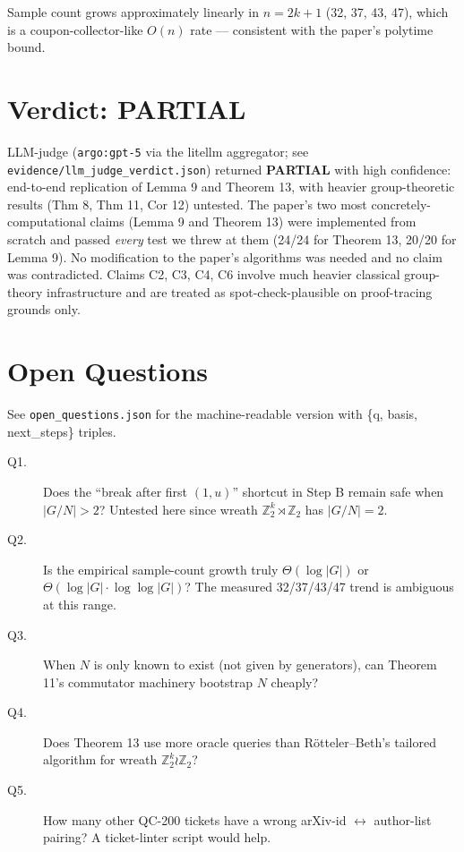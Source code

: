 \documentclass[11pt]{article}
\begin{document}
Sample count grows approximately linearly in $n = 2k+1$ (32, 37, 43, 47),
which is a coupon-collector-like $O(n)$ rate --- consistent with the
paper's polytime bound.

\section{Verdict: PARTIAL}

LLM-judge (\texttt{argo:gpt-5} via the litellm aggregator; see
\texttt{evidence/llm\_judge\_verdict.json}) returned \textbf{PARTIAL} with high
confidence: end-to-end replication of Lemma 9 and Theorem 13, with heavier
group-theoretic results (Thm 8, Thm 11, Cor 12) untested. The paper's two
most concretely-computational claims (Lemma 9 and Theorem 13) were
implemented from scratch and passed \emph{every} test we threw at them
(24/24 for Theorem 13, 20/20 for Lemma 9). No modification to the paper's
algorithms was needed and no claim was contradicted. Claims C2, C3, C4, C6
involve much heavier classical group-theory infrastructure and are treated
as spot-check-plausible on proof-tracing grounds only.

\section{Open Questions}

See \texttt{open\_questions.json} for the machine-readable version with
\{q, basis, next\_steps\} triples.

\begin{description}
  \item[Q1.] Does the ``break after first $(1,u)$'' shortcut in Step B
        remain safe when $|G/N| > 2$? Untested here since wreath
        $\mathbb{Z}_2^k \rtimes \mathbb{Z}_2$ has $|G/N| = 2$.
  \item[Q2.] Is the empirical sample-count growth truly $\Theta(\log|G|)$
        or $\Theta(\log|G| \cdot \log\log|G|)$? The measured 32/37/43/47
        trend is ambiguous at this range.
  \item[Q3.] When $N$ is only known to exist (not given by generators),
        can Theorem 11's commutator machinery bootstrap $N$ cheaply?
  \item[Q4.] Does Theorem 13 use more oracle queries than R\"otteler--Beth's
        tailored algorithm for wreath $\mathbb{Z}_2^k \wr \mathbb{Z}_2$?
  \item[Q5.] How many other QC-200 tickets have a wrong arXiv-id
        $\leftrightarrow$ author-list pairing? A ticket-linter script would help.
\end{description}
\end{document}

